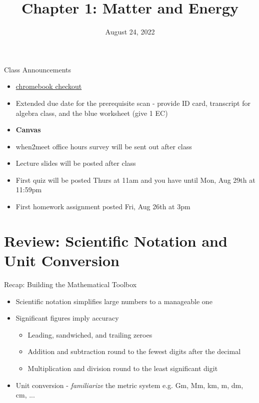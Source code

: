 \documentclass[11pt]{beamer}
\title{Chapter 1: Matter and Energy}
\institute{Chemistry Department, Cypress College}
\date{August 24, 2022}
\begin{document}
\begin{frame}
  \titlepage
\end{frame}

\begin{frame}{Class Announcements}
  \begin{itemize}
  \item \href{https://www.cypresscollege.edu/academics/divisions-special-programs/librarylrc/library/}
    {chromebook checkout}
  \item Extended due date for the prerequisite scan - provide ID card, transcript
    for algebra class, and the blue worksheet (give 1 EC)
  \item[] \textbf{Canvas}
  \item when2meet office hours survey will be sent out after class
  \item Lecture slides will be posted after class
  \item First quiz will be posted Thurs at 11am and you have until Mon, Aug 29th
    at 11:59pm
  \item First homework assignment posted Fri, Aug 26th at 3pm
  \end{itemize}
\end{frame}

\section{Review: Scientific Notation and Unit Conversion}

\begin{frame}{Recap: Building the Mathematical Toolbox}
  \begin{itemize}
  \item Scientific notation simplifies large numbers to
    a manageable one
  \item Significant figures imply accuracy
    \begin{itemize}
    \item Leading, sandwiched, and trailing zeroes
    \item Addition and subtraction round to the fewest digits
      after the decimal
    \item Multiplication and division round to the least significant
      digit
    \end{itemize}
  \item Unit conversion - \textit{familiarize} the metric system
    e.g. Gm, Mm, km, m, dm, cm, ...
  \end{itemize}
\end{frame}
\end{document}
